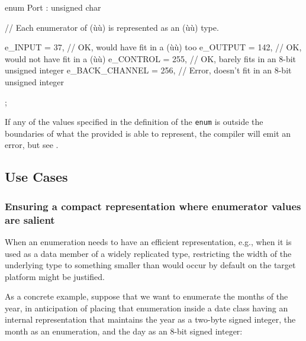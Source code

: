 \begin{emcppslisting}
enum Port : unsigned char
{
    // Each enumerator of (ù{}ù) is represented as an (ù{}ù) type.

    e_INPUT        =  37,  // OK, would have fit in a (ù{}ù) too
    e_OUTPUT       = 142,  // OK, would not have fit in a (ù{}ù)
    e_CONTROL      = 255,  // OK, barely fits in an 8-bit unsigned integer
    e_BACK_CHANNEL = 256,  // Error, doesn't fit in an 8-bit unsigned integer
};
\end{emcppslisting}

\noindent If any of the values specified in the definition of the \lstinline!enum! is
outside the boundaries of what the provided  is
able to represent, the compiler will emit an error, but see . 

\subsection[Use Cases]{Use Cases}\label{use-cases}

\subsubsection[Ensuring a compact representation where enumerator values are salient]{Ensuring a compact representation where enumerator values are salient}\label{ensuring-a-compact-representation-where-enumerator-values-are-salient}

When an enumeration needs to have an efficient representation, e.g.,
when it is used as a data member of a widely replicated type,
restricting the width of the underlying type to something smaller than
would occur by default on the target platform might be justified.

As a concrete example, suppose that we want to enumerate the months of
the year, in anticipation of placing that enumeration
inside a date class having an internal representation that maintains the
year as a two-byte signed integer, the month as an enumeration, and the
day as an 8-bit signed integer:

